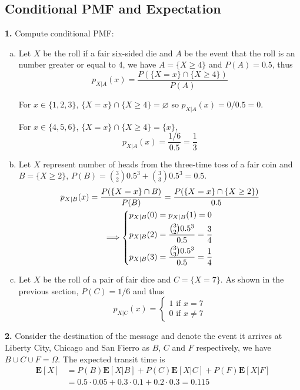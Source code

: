 \documentclass[a4paper,12pt]{article}
\newcommand{\E}{\mathbf E}
\newcommand{\exercise}[1]{\noindent\textbf{#1.}}
\begin{document}
\subsection{Conditional PMF and Expectation}
\exercise 1  Compute conditional PMF:
\begin{enumerate}[(a)]
  \item Let $X$ be the roll if a fair six-sided die and $A$ be the event that
    the roll is an number greater or equal to 4, we have $A = \{X \ge 4\}$
    and $P(A) = 0.5$, thus
    \[p_{X|A}(x) = \frac{P(\{X = x\}\cap\{X \ge 4\})}{P(A)}\]

    For $x \in \{1, 2, 3\}$, $\{X = x\}\cap\{X \ge 4\} = \varnothing$
    so $p_{X|A}(x) = 0/0.5 = 0$.

    For $x \in \{4, 5, 6\}$, $\{X = x\}\cap\{X \ge 4\} = \{x\}$,
    \[p_{X|A}(x) = \frac{1/6}{0.5} = \frac{1}{3}\]
  \item Let $X$ represent number of heads from the three-time toss
    of a fair coin and $B = \{X \ge 2\}$,
    $P(B) = \binom{3}{2}0.5^3 + \binom{3}{3}0.5^3 = 0.5$.
    \begin{multline*}
      p_{X|B}(x) = \frac{P(\{X = x\}\cap B)}{P(B)}
      = \frac{P(\{X = x\}\cap\{X \ge 2\})}{0.5}\\
      \Longrightarrow\begin{dcases}
        p_{X|B}(0) = p_{X|B}(1) = 0\\
        p_{X|B}(2) = \frac{\binom{3}{2}0.5^3}{0.5} = \frac{3}{4}\\
        p_{X|B}(3) = \frac{\binom{3}{3}0.5^3}{0.5} = \frac{1}{4}
      \end{dcases}
    \end{multline*}
  \item Let $X$ be the roll of a pair of fair dice and $C = \{X = 7\}$.
    As shown in the previous section, $P(C) = 1/6$ and thus
    \[p_{X|C}(x) = \begin{cases}
      1\text{ if }x = 7\\
      0\text{ if }x \neq 7
    \end{cases}\]
\end{enumerate}

\exercise 2  Consider the destination of the message and denote the event
it arrives at Liberty City, Chicago and San Fierro as $B$, $C$ and $F$
respectively, we have $B\cup C\cup F = \Omega$.  The expected transit time is
\begin{align*}
  \E[X] &= P(B)\E[X|B] + P(C)\E[X|C] + P(F)\E[X|F]\\
  &= 0.5\cdot 0.05 + 0.3\cdot 0.1 + 0.2\cdot 0.3 = 0.115
\end{align*}
\end{document}
